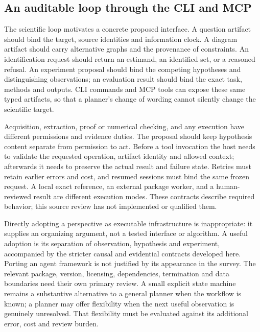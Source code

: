 \subsection{An auditable loop through the CLI and MCP}

The scientific loop motivates a concrete proposed interface. A question artifact
should bind the target, source identities and information clock. A diagram artifact
should carry alternative graphs and the provenance of constraints. An identification
request should return an estimand, an identified set, or a reasoned refusal. An
experiment proposal should bind the competing hypotheses and distinguishing
observations; an evaluation result should bind the exact task, methods and outputs.
CLI commands and MCP tools can expose these same typed artifacts, so that a
planner's change of wording cannot silently change the scientific target.

Acquisition, extraction, proof or numerical checking, and any execution have
different permissions and evidence duties. The proposal should keep hypothesis
content separate from permission to act. Before a tool invocation the host needs
to validate the requested operation, artifact identity and allowed context;
afterwards it needs to preserve the actual result and failure state. Retries
must retain earlier errors and cost, and resumed sessions must bind the same
frozen request. A local exact reference, an external package worker, and a
human-reviewed result are different execution modes. These contracts describe
required behavior; this source review has not implemented or qualified them.

Directly adopting a perspective as executable infrastructure is inappropriate:
it supplies an organizing argument, not a tested interface or algorithm. A useful
adoption is its separation of observation, hypothesis and experiment, accompanied
by the stricter causal and evidential contracts developed here. Porting an agent
framework is not justified by its appearance in the survey. The relevant package,
version, licensing, dependencies, termination and data boundaries need their own
primary review. A small explicit state machine remains a substantive alternative
to a general planner when the workflow is known; a planner may offer flexibility
when the next useful observation is genuinely unresolved. That flexibility must
be evaluated against its additional error, cost and review burden.

